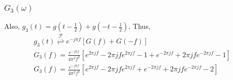 \documentclass{beamer}
\providecommand{\sbrak}[1]{\ensuremath{{}\left[#1\right]}}
\providecommand{\brak}[1]{\ensuremath{\left(#1\right)}}
\providecommand{\fourier}{\overset{\mathcal{F}}{ \rightleftharpoons}}
\begin{document}
\begin{frame}
    \frametitle{$G_3(\omega)$}
    \begin{flushleft}
Also, $g_3(t) = g\brak{t - \frac{1}{2}} + g\brak{-t - \frac{1}{2}}$. Thus, 
\begin{align}
    g_3(t) \fourier e^{-j\pi f}\sbrak{G(f) + G(-f)}\\
    G_3(f)= \frac{e^{-j\pi f}}{4\pi^2f^2}\sbrak{e^{2\pi jf} - 2\pi jfe^{2\pi jf} - 1  +
    e^{-2\pi jf} + 2\pi jfe^{-2\pi jf} -1}\\
        G_3(f) = \frac{e^{-j\pi f}}{4\pi^2f^2} \left[e^{2\pi jf} - 2\pi jfe^{2\pi jf}+\right. 
        \left. e^{-2\pi jf} + 2\pi jfe^{-2\pi jf} -2 \right]
  \end{align}
    \end{flushleft}
\end{frame}
\end{document}
